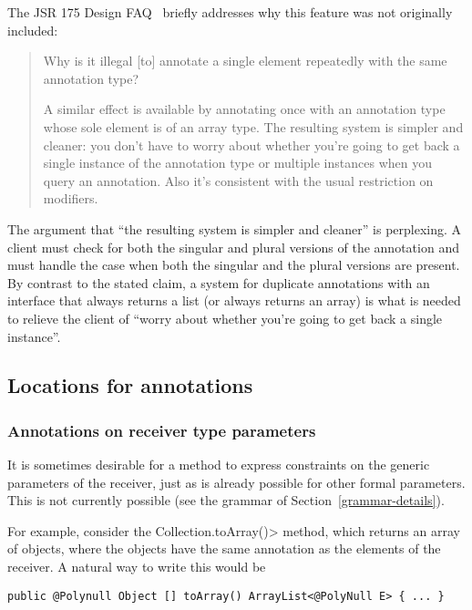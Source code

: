 \documentclass[10pt]{article}
\begin{document}
The JSR 175 Design FAQ~\cite{JSR175-PFD2} briefly addresses why this
feature was not originally included:

\begin{quote}
Why is it illegal [to] annotate a single element repeatedly with the same annotation type?

A similar effect is available by annotating once with an annotation type
whose sole element is of an array type. The resulting system is simpler and
cleaner: you don't have to worry about whether you're going to get back a
single instance of the annotation type or multiple instances when you query
an annotation. Also it's consistent with the usual restriction on
modifiers.
\end{quote}

The argument that ``the resulting system is simpler and cleaner'' is
perplexing.  A client must check for both the singular and plural versions
of the annotation and must handle the case when both the singular and the
plural versions are present.  By contrast to the stated claim, a system for
duplicate annotations with an interface that always returns a list (or
always returns an array) is what is needed to relieve the client of ``worry
about whether you're going to get back a single instance''.


\subsection{Locations for annotations\label{locations-for-annotations}}


\subsubsection{Annotations on receiver type parameters\label{receiver-type-parameter-annotations}}

It is sometimes desirable for a method to express constraints on the
generic parameters of the receiver, just as is already possible for other
formal parameters.  This is not currently possible (see the grammar of
Section~\ref{grammar-details}).

For example, consider the \<Collection.toArray()> method, which returns an
array of objects, where the objects have the same annotation as the
elements of the receiver.  A natural way to write this would be 

\begin{Verbatim}
public @Polynull Object [] toArray() ArrayList<@PolyNull E> { ... }
\end{Verbatim}
\end{document}

